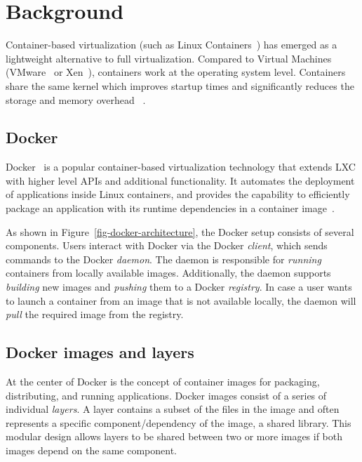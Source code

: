 \section{Background}
\label{sec:background}

Container-based virtualization (such as Linux Containers~\cite{LXC}) has
emerged as a lightweight alternative to full virtualization.
%
Compared to Virtual Machines (\eg VMware~\cite{VMware} or Xen~\cite{xen}),
containers work at the operating system level.
%
Containers share the same kernel which improves startup times and significantly
reduces the storage and memory overhead ~\cite{ContainerVirtualization}.

\subsection{Docker}

Docker~\cite{docker} is a popular container-based virtualization technology
that extends LXC with higher level APIs and additional functionality.
%
It automates the deployment of applications inside Linux containers, and
provides the capability to efficiently package an application with its runtime
dependencies in a container image~\cite{slacker}.



As shown in Figure~\ref{fig-docker-architecture}, the Docker setup consists of
several components.
%
Users interact with Docker via the Docker \emph{client}, which sends commands
to the Docker \emph{daemon}.
%
The daemon is responsible for \emph{running} containers from locally available
images.
%
Additionally, the daemon supports \emph{building} new images and \emph{pushing}
them to a Docker \emph{registry}.
%
In case a user wants to launch a container from an image that is not available
locally, the daemon will \emph{pull} the required image from the registry.

\subsection{Docker images and layers}
\label{sec-image-layers}

At the center of Docker is the concept of container images for packaging,
distributing, and running applications.
%
Docker images consist of a series of individual \emph{layers}.
%
A layer contains a subset of the files in the image and often represents a
specific component/dependency of the image, \eg a shared library.
%
This modular design allows layers to be shared between two or more
images if both images depend on the same component.

